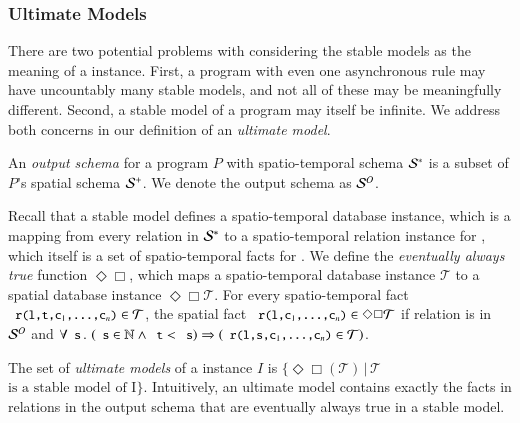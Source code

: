 

\subsubsection{Ultimate Models}
There are two potential problems with considering the stable models as the meaning of a \lang instance.  
First, a program with even one asynchronous rule may have uncountably many stable models, and not all of these may be meaningfully different.  Second, a stable model of a \lang program may itself be infinite.    We address both concerns in our definition of an {\em ultimate model}.

An {\em output schema} for a \lang program $P$ with spatio-temporal schema
$\stschema$ is a subset of $P$'s spatial schema $\sschema$.  We denote the output schema as
$\oschema$.

Recall that a stable model defines a spatio-temporal database instance, which is a mapping from every relation  in $\stschema$ to a spatio-temporal relation instance for , which itself is a set of spatio-temporal facts for .  We define the {\em eventually always true} function $\Diamond\Box$, which maps a spatio-temporal database instance $\mathcal{T}$ to a spatial database instance $\Diamond\Box\mathcal{T}$.  For every spatio-temporal fact $\dedalus{r(l,t,c\sub{1},\ldots,c\sub{n})} \in \mathcal{T}$, the spatial fact $\dedalus{r(l,c\sub{1},\ldots,c\sub{n})} \in \Diamond\Box\mathcal{T}$ if relation  is in $\oschema$ and $\forall \dedalus{s}\, . \, \left(\dedalus{s} \in \mathbb{N} \land \dedalus{t} < \dedalus{s}\right) \Rightarrow \left(\dedalus{r(l,s,c\sub{1},\ldots,c\sub{n})} \in \mathcal{T}\right)$.

The set of {\em ultimate models} of a \lang instance $I$ is $\{\Diamond\Box(\mathcal{T}) \, | \, \mathcal{T}$  $\text{is a stable model of I}\}$.  Intuitively, an ultimate model contains exactly the facts in relations in the output schema that are eventually always true in a stable model.

